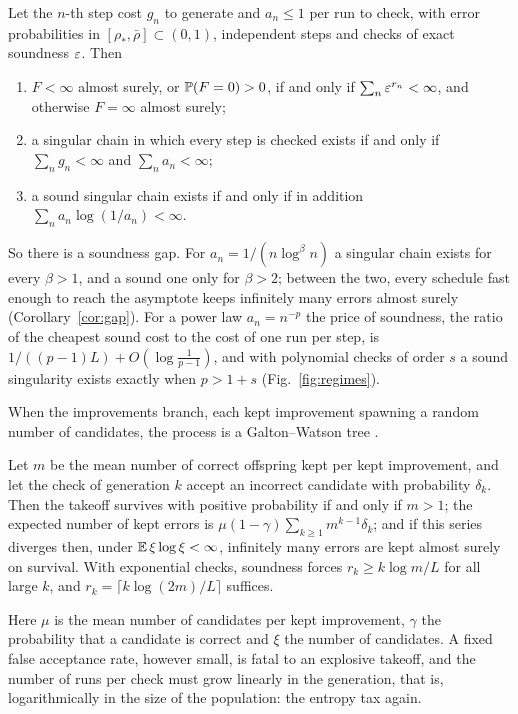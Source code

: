 \begin{mainthm}\label{thm:E}
Let the $n$-th step cost $g_{n}$ to generate and $a_{n}\le1$ per run to check, with error probabilities in $[\rho_{\ast},\bar\rho]\subset(0,1)$, independent steps and checks of exact soundness $\varepsilon$. Then
\begin{enumerate}[label=\textup{(\roman*)},leftmargin=2.2em,itemsep=1pt]
\item $F<\infty$ almost surely, or $\mathbb{P}(F=0)>0$, if and only if $\sum_{n}\varepsilon^{r_{n}}<\infty$, and otherwise $F=\infty$ almost surely;
\item a singular chain in which every step is checked exists if and only if $\sum_{n}g_{n}<\infty$ and $\sum_{n}a_{n}<\infty$;
\item a sound singular chain exists if and only if in addition $\sum_{n}a_{n}\log(1/a_{n})<\infty$.
\end{enumerate}
\end{mainthm}

So there is a soundness gap. For $a_{n}=1/(n\log^{\beta}n)$ a singular chain exists for every $\beta>1$, and a sound one only for $\beta>2$; between the two, every schedule fast enough to reach the asymptote keeps infinitely many errors almost surely (Corollary~\ref{cor:gap}). For a power law $a_{n}=n^{-p}$ the price of soundness, the ratio of the cheapest sound cost to the cost of one run per step, is $1/((p-1)L)+O(\log\frac1{p-1})$, and with polynomial checks of order $s$ a sound singularity exists exactly when $p>1+s$ (Fig.~\ref{fig:regimes}).

When the improvements branch, each kept improvement spawning a random number of candidates, the process is a Galton--Watson tree \cite{WG75,AN72}.

\begin{mainthm}\label{thm:F}
Let $m$ be the mean number of correct offspring kept per kept improvement, and let the check of generation $k$ accept an incorrect candidate with probability $\delta_{k}$. Then the takeoff survives with positive probability if and only if $m>1$; the expected number of kept errors is $\mu(1-\gamma)\sum_{k\ge1}m^{k-1}\delta_{k}$; and if this series diverges then, under $\mathbb{E}\,\xi\log\xi<\infty$, infinitely many errors are kept almost surely on survival. With exponential checks, soundness forces $r_{k}\ge k\log m/L$ for all large $k$, and $r_{k}=\lceil k\log(2m)/L\rceil$ suffices.
\end{mainthm}

Here $\mu$ is the mean number of candidates per kept improvement, $\gamma$ the probability that a candidate is correct and $\xi$ the number of candidates. A fixed false acceptance rate, however small, is fatal to an explosive takeoff, and the number of runs per check must grow linearly in the generation, that is, logarithmically in the size of the population: the entropy tax again.

